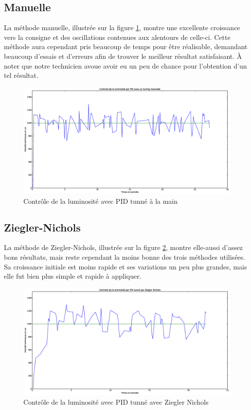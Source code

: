 \documentclass[a4paper,10pt]{report}
\begin{document}
\subsection{Manuelle}
La méthode manuelle, illustrée sur la figure \ref{fig:manuelle}, montre une excellente croissance vers la consigne et des oscillations contenues aux alentours de celle-ci.
Cette méthode aura cependant pris beaucoup de temps pour être réalisable, demandant beaucoup d'essais et d'erreurs afin de trouver le meilleur résultat satisfaisant.
À noter que notre technicien avoue avoir eu un peu de chance pour l'obtention d'un tel résultat. %
\begin{figure}[hb!]
   \centering
   \includegraphics[scale=0.35]{Manuelle.eps}
   \caption{\label{fig:manuelle} Contrôle de la luminosité avec PID tunné à la main}
\end{figure}

\subsection{Ziegler-Nichols}
La méthode de Ziegler-Nichols, illustrée sur la figure \ref{fig:ziegler}, montre elle-aussi d'assez bons résultats, mais reste cependant la moins bonne des trois méthodes utilisées. Sa croissance initiale est moins rapide et ses variations un peu plus grandes, mais elle fut bien plus simple et rapide à appliquer.
\begin{figure}[hb!]
   \centering
   \includegraphics[scale=0.35]{Ziegler.eps}
   \caption{\label{fig:ziegler} Contrôle de la luminosité avec PID tunné avec Ziegler Nichols}
\end{figure}
\end{document}

